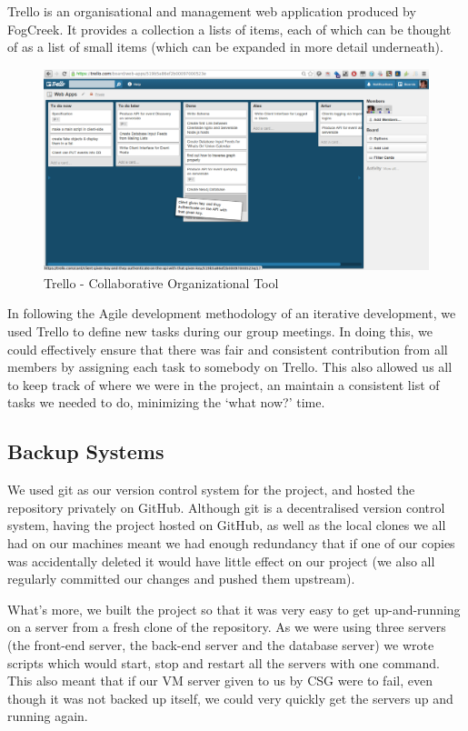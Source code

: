 \documentclass[11pt]{article}
\let\footnote=\endnote
\begin{document}
Trello\footnote{\url{http://trello.com}} is an organisational and management web application produced by FogCreek. It provides a collection a lists of items, each of which can be thought of as a list of small items (which can be expanded in more detail underneath).

\begin{figure}[H]
\centering
\includegraphics[scale=0.35]{images/trello.png}
\caption{\label{fig:trello} Trello - Collaborative Organizational Tool}
\end{figure}
In following the Agile development methodology of an iterative development, we used Trello to define new tasks during our group meetings. In doing this, we could effectively ensure that there was fair and consistent contribution from all members by assigning each task to somebody on Trello. This also allowed us all to keep track of where we were in the project, an maintain a consistent list of tasks we needed to do, minimizing the `what now?' time.

\subsection{Backup Systems}
We used git as our version control system for the project, and hosted the repository privately on GitHub. Although git is a decentralised version control system, having the project hosted on GitHub, as well as the local clones we all had on our machines meant we had enough redundancy that if one of our copies was accidentally deleted it would have little effect on our project (we also all regularly committed our changes and pushed them upstream).

What's more, we built the project so that it was very easy to get up-and-running on a server from a fresh clone of the repository. As we were using three servers (the front-end server, the back-end server and the database server) we wrote scripts which would start, stop and restart all the servers with one command. This also meant that if our VM server given to us by CSG were to fail, even though it was not backed up itself, we could very quickly get the servers up and running again.
\end{document}
